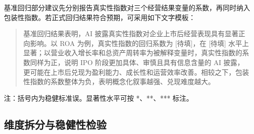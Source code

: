 基准回归部分建议先分别报告真实性指数对三个经营结果变量的系数，再同时纳入包装性指数。若正式回归结果符合预期，可采用如下文字模板：

\begin{quote}
基准回归结果表明，AI 披露真实性指数对企业上市后经营表现具有显著正向影响。以 ROA 为例，真实性指数的回归系数为 [待填]，在 [待填] 水平上显著；以营业收入增长率和总资产周转率为被解释变量时，真实性指数的系数同样为正，说明 IPO 阶段更加具体、审慎且具有信息含量的 AI 披露，更可能在上市后兑现为盈利能力、成长性和运营效率改善。相较之下，包装性指数的系数整体为负，表明概念化叙事越强、兑现难度越大。
\end{quote}

\begin{table}[H]
\centering
\caption{基准回归结果模板}

\vspace{0.3em}
\parbox{0.92\textwidth}{\small 注：括号内为稳健标准误。显著性水平可按 *、**、*** 标注。}
\end{table}

\subsection{维度拆分与稳健性检验}

